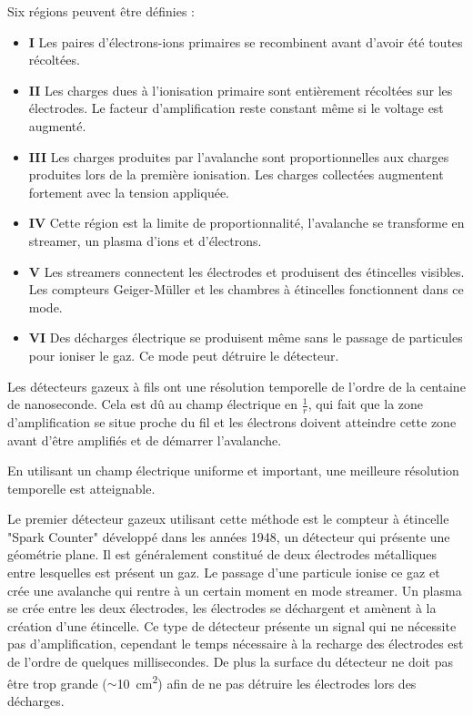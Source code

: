 Six régions peuvent être définies :

\begin{itemize}
	\item \textbf{I} Les paires d'électrons-ions primaires se recombinent avant d'avoir été toutes récoltées.
	\item \textbf{II} Les charges dues à l'ionisation primaire sont entièrement récoltées sur les électrodes. Le facteur d'amplification reste constant même si le voltage est augmenté.
	\item \textbf{III} Les charges produites par l'avalanche sont proportionnelles aux charges produites lors de la première ionisation. Les charges collectées augmentent fortement avec la tension appliquée.
	\item \textbf{IV} Cette région est la limite de proportionnalité, l'avalanche se transforme en streamer, un plasma d'ions et d'électrons.
	\item \textbf{V} Les streamers connectent les électrodes et produisent des étincelles visibles. Les compteurs Geiger-Müller et les chambres à étincelles fonctionnent dans ce mode.
	\item \textbf{VI} Des décharges électrique se produisent même sans le passage de particules pour ioniser le gaz. Ce mode peut détruire le détecteur.
\end{itemize}

Les détecteurs gazeux à fils ont une résolution temporelle de l'ordre de la centaine de nanoseconde. Cela est dû au champ électrique en $\frac{1}{r}$, qui fait que la zone d'amplification se situe proche du fil et les électrons doivent atteindre cette zone avant d'être amplifiés et de démarrer l'avalanche.

En utilisant un champ électrique uniforme et important, une meilleure résolution temporelle est atteignable.

Le premier détecteur gazeux utilisant cette méthode est le compteur à étincelle "Spark Counter" développé dans les années 1948, un détecteur qui présente une géométrie plane. Il est généralement constitué de deux électrodes métalliques entre lesquelles est présent un gaz. Le passage d'une particule ionise ce gaz et crée une avalanche qui rentre à un certain moment en mode streamer. Un plasma se crée entre les deux électrodes, les électrodes se déchargent et amènent à la création d'une étincelle. Ce type de détecteur présente un signal qui ne nécessite pas d'amplification, cependant le temps nécessaire à la recharge des électrodes est de l'ordre de quelques millisecondes. De plus la surface du détecteur ne doit pas être trop grande ($\sim$\SI{10}{\square\centi\meter}) afin de ne pas détruire les électrodes lors des décharges.

